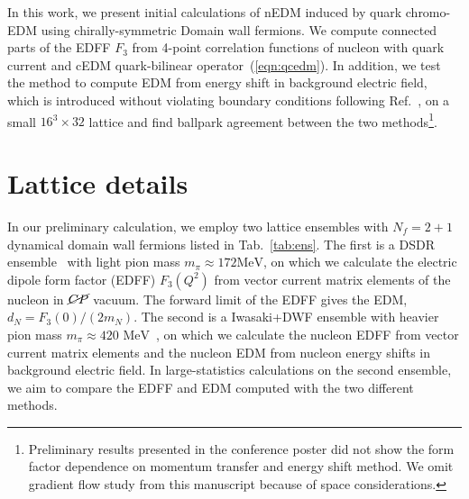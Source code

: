\documentclass{PoS}
\newcommand{\CPviol}{{\cancel{CP}}}
\begin{document}
In this work, we present initial calculations of nEDM induced by quark chromo-EDM using
chirally-symmetric Domain wall fermions.
We compute connected parts of the EDFF $F_3$ from 4-point correlation functions of nucleon with
quark current and cEDM quark-bilinear operator~(\ref{eqn:qcedm}).
In addition, we test the method to compute EDM from energy shift in background electric field,
which is introduced without violating boundary conditions following Ref.~\cite{Detmold:2009dx},
on a small $16^3\times32$ lattice and find ballpark agreement between the two methods\footnote{
  Preliminary results presented in the conference poster did not show the form factor dependence 
  on momentum transfer and energy shift method. 
  We omit gradient flow study from this manuscript because of space considerations.
}.

\section{Lattice details}
In our preliminary calculation, we employ two lattice ensembles with $N_f=2+1$ dynamical domain
wall fermions listed in Tab.~\ref{tab:ens}.
The first is a DSDR ensemble~\cite{Arthur:2012yc} with light pion mass $m_\pi\approx172\text{
MeV}$, on which we calculate the electric dipole form factor (EDFF) $F_3(Q^2)$ 
from vector current matrix elements of the nucleon in $\CPviol$ vacuum. 
The forward limit of the EDFF gives the EDM, $d_N=F_3(0)/(2m_N)$.
The second is a Iwasaki+DWF ensemble with heavier pion mass 
$m_\pi\approx420\text{ MeV}$~\cite{Blum:2011pu}, on which we calculate 
the nucleon EDFF from vector current matrix elements and the nucleon EDM 
from nucleon energy shifts in background electric field.
In large-statistics calculations on the second ensemble, we aim to compare the EDFF and EDM 
computed with the two different methods.
\end{document}
